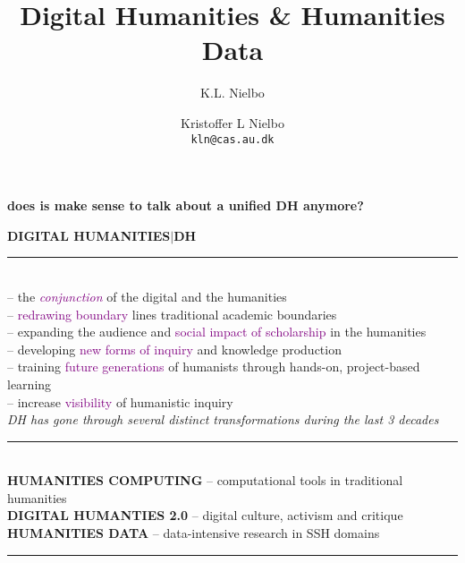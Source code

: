 \documentclass[8pt]{beamer}
\author{K.L. Nielbo}
\title{Digital Humanities \& Humanities Data}
\subtitle{}
\author{Kristoffer L Nielbo \\\texttt{kln@cas.au.dk}}
\date{}
\institute{DAI$\mid$IMC$\mid$AARHUS UNIVERSITY}
\begin{document}
\begin{frame}
\titlepage
\end{frame}

\begin{frame}
	\begin{center}
		\textbf{does is make sense to talk about a unified DH anymore?}
	\end{center}
\end{frame}

\begin{frame}{}
\textbf{DIGITAL HUMANITIES$\mid$DH}\\
\noindent\rule{1cm}{0.4pt}\\
-- the \textit{\textcolor{purple}{conjunction}} of the digital and the humanities\\
-- \textcolor{purple}{redrawing boundary} lines traditional academic boundaries\\
-- expanding the audience and \textcolor{purple}{social impact of scholarship} in the humanities\\
-- developing \textcolor{purple}{new forms of inquiry} and knowledge production\\
-- training \textcolor{purple}{future generations} of humanists through hands-on, project-based learning\\
-- increase \textcolor{purple}{visibility} of humanistic inquiry\\
\medskip
\textit{DH has gone through several distinct transformations during the last 3 decades}\\
\noindent\rule{2cm}{0.4pt}\\
\textbf{HUMANITIES COMPUTING} -- computational tools in traditional humanities\\
\textbf{DIGITAL HUMANTIES 2.0} -- digital culture, activism and critique\\
\textbf{HUMANITIES DATA} -- data-intensive research in SSH domains\\
\noindent\rule{4cm}{0.4pt}\\
\end{frame}


\end{document}
